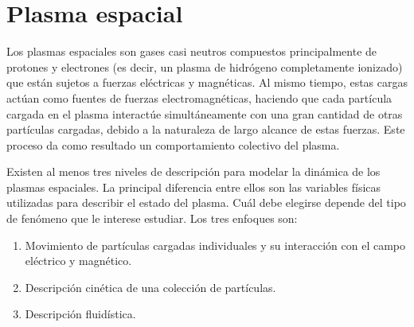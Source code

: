 \section{Plasma espacial}

Los plasmas espaciales son gases casi neutros compuestos
principalmente de protones y electrones (es decir, un plasma de
hidrógeno completamente ionizado) que están sujetos a fuerzas
eléctricas y magnéticas. Al mismo tiempo, estas cargas actúan como
fuentes de fuerzas electromagnéticas, haciendo que cada partícula
cargada en el plasma interactúe simultáneamente con una gran cantidad
de otras partículas cargadas, debido a la naturaleza de largo alcance
de estas fuerzas. Este proceso da como resultado un comportamiento
colectivo del plasma.

Existen al menos tres niveles de descripción para modelar la dinámica de
los plasmas espaciales. La principal diferencia entre ellos son las
variables físicas utilizadas para describir el estado del plasma. Cuál
debe elegirse depende del tipo de fenómeno que le interese
estudiar. Los tres enfoques son:
\begin{enumerate}
\item Movimiento de partículas cargadas individuales y su interacción
con el campo eléctrico y magnético.
\item Descripción cinética de una colección de partículas.
\item Descripción fluidística.
\end{enumerate}

